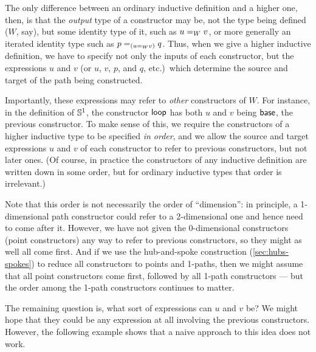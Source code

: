 The only difference between an ordinary inductive definition and a higher one, then, is that the \emph{output} type of a constructor may be, not the type being defined ($W$, say), but some identity type of it, such as $\id[W]uv$, or more generally an iterated identity type such as $\id[({\id[W]uv})]pq$.
Thus, when we give a higher inductive definition, we have to specify not only the inputs of each constructor, but the expressions $u$ and $v$ (or $u$, $v$, $p$, and $q$, etc.)\ which determine the source and target of the path being constructed.

Importantly, these expressions may refer to \emph{other} constructors of $W$.
For instance, in the definition of $\Sn^1$, the constructor $\lloop$ has both $u$ and $v$ being $\base$, the previous constructor.
To make sense of this, we require the constructors of a higher inductive type to be specified \emph{in order}, and we allow the source and target expressions $u$ and $v$ of each constructor to refer to previous constructors, but not later ones.
(Of course, in practice the constructors of any inductive definition are written down in some order, but for ordinary inductive types that order is irrelevant.)

Note that this order is not necessarily the order of ``dimension'': in principle, a 1-dimensional path constructor could refer to a 2-dimensional one and hence need to come after it.
However, we have not given the 0-dimensional constructors (point constructors) any way to refer to previous constructors, so they might as well all come first.
And if we use the hub-and-spoke construction (\autoref{sec:hubs-spokes}) to reduce all constructors to points and 1-paths, then we might assume that all point constructors come first, followed by all 1-path constructors --- but the order among the 1-path constructors continues to matter.

The remaining question is, what sort of expressions can $u$ and $v$ be?
We might hope that they could be any expression at all involving the previous constructors.
However, the following example shows that a naive approach to this idea does not work.

